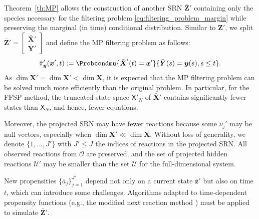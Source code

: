Theorem~\ref{th:MP} allows the construction of another \ac{SRN} $\bar{\boldsymbol{Z}}'$ containing only the species necessary for the filtering problem \eqref{eq:filtering_problem_margin} while preserving the marginal (in time) conditional distribution. Similar to $\boldsymbol{Z}'$, we split $\bar{\boldsymbol{Z}}' = \begin{bmatrix} \bar{\boldsymbol{X}}' \\  \bar{\boldsymbol{Y}}' \end{bmatrix}$ and define the \ac{MP} filtering problem as follows:
\begin{equation}
    \label{eq:pi_bar_def}
    \bar{\pi}'_{\boldsymbol{y}} (\boldsymbol{x}', t) := \Probcondmu{\bar{\boldsymbol{X}}'(t) = \boldsymbol{x}' }{ \bar{\boldsymbol{Y}}(s) = \boldsymbol{y}(s), s \leq t }.
\end{equation}
As $\dim{\bar{\boldsymbol{X}}'} = \dim{\boldsymbol{X}}' <  \dim{\boldsymbol{X}}$, it is expected that the \ac{MP} filtering problem can be solved much more efficiently than the original problem. In particular, for the \ac{FFSP} method, the truncated state space $\mathsf{X}'_N$ of $\bar{\boldsymbol{X}}'$ contains significantly fewer states than $\mathsf{X}_N$, and hence, fewer equations. 

Moreover, the projected \ac{SRN} may have fewer reactions because some $\nu_j'$ may be null vectors, especially when  $\dim{\boldsymbol{X}}' \ll  \dim{\boldsymbol{X}}$. Without loss of generality, we denote $\{ 1, \dots, J' \}$ with $J' \leq J$ the indices of reactions in the projected \ac{SRN}. All observed reactions from $\mathcal{O}$ are preserved, and the set of projected hidden reactions $\mathcal{U}'$ may be smaller than the set $\mathcal{U}$ for the full-dimensional system.

\begin{remark}
    New propensities $\{\bar{a}_j\}_{j=1}^{J'}$ depend not only on a current state $\bar{\boldsymbol{z}}'$ but also on time $t$, which can introduce some challenges. Algorithms adapted to time-dependent propensity functions (e.g., the modified next reaction method \cite[Section~5]{Anderson2007ModifiedNextReaction}) must be applied to simulate $\bar{\boldsymbol{Z}}'$.
\end{remark}

